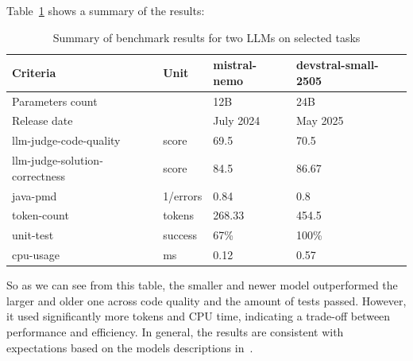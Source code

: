Table~\ref{tab:benchmark-results-summary} shows a summary of the results:
\begin{table}[H]
    \centering
    \begin{tabular}{|l|l|l|l|}
        \hline
        \textbf{Criteria}	& \textbf{Unit} & \textbf{mistral-nemo}	& \textbf{devstral-small-2505} \\
        \hline
        Parameters count    &               & 12B                   & 24B \\
        Release date        &               & July 2024             & May 2025 \\
        \hline
        llm-judge-code-quality & score & 69.5 & 70.5 \\
        llm-judge-solution-correctness & score & 84.5 & 86.67 \\
        java-pmd & 1/errors & 0.84 & 0.8 \\
        token-count & tokens & 268.33 & 454.5 \\
        unit-test & success & 67\% & 100\% \\
        cpu-usage & ms & 0.12 & 0.57 \\
        \hline
    \end{tabular}
    \caption{Summary of benchmark results for two LLMs on selected tasks}
    \label{tab:benchmark-results-summary}
\end{table}
So as we can see from this table, the smaller and newer model outperformed the larger and older one across code quality and the amount of tests passed.
However, it used significantly more tokens and CPU time, indicating a trade-off between performance and efficiency.
In general, the results are consistent with expectations based on the models descriptions in~\cite{mistralModelsBenchmarks}.

